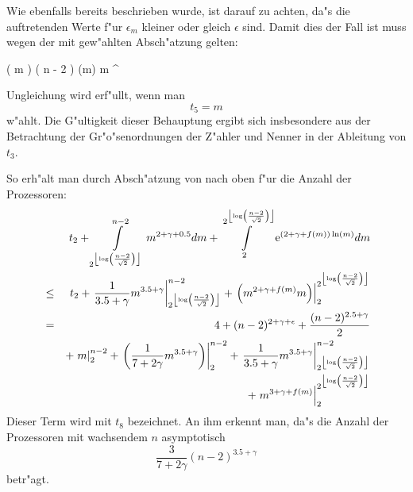 Wie ebenfalls bereits beschrieben wurde, ist darauf zu achten, da"s die
auftretenden Werte f"ur $\epsilon_m$ kleiner oder gleich $\epsilon$ sind.
Damit dies der Fall ist muss wegen der mit  
gew"ahlten Absch"atzung gelten:
\begin{MyEqnArray}
    \MT  \log( m ) \MT \leq \MT \lc \log( n - 2 ) \rc 
\MNl
    \Rightarrow \MT \log(m) \MT \leq \MT
        \lc \log \lb {} \rb \rc
\MNl
    \Rightarrow \MT m \MT \leq {}^{ \lc \log \lb {} \rb \rc }
\end{MyEqnArray}

Ungleichung
 wird erf"ullt, wenn man 
\[ t_5 = m \] w"ahlt. Die G"ultigkeit dieser Behauptung ergibt
sich insbesondere aus
der Betrachtung der Gr"o"senordnungen der Z"ahler und Nenner in der
Ableitung von $t_3$.

So erh"alt man durch Absch"atzung von  nach oben
f"ur die Anzahl der Prozessoren:
\begin{eqnarray*}
    & & t_2 + 
        \int\limits_{ 2^{\left\lfloor \log \left( \frac{n-2}{\sqrt{2}} \right) \right\rfloor} }^{n-2} 
            m^{2+\gamma+0.5} dm
        + \int\limits_2^{ 2^{\left\lfloor \log \left( \frac{n-2}{\sqrt{2}} \right) \right\rfloor} }
            \mbox{\rm e}^{ (2+\gamma+f(m)) \ln(m) } dm \\
    & \leq & t_2 + 
        \left. \frac{1}{3.5+\gamma} m^{3.5+\gamma} 
        \right|_{ 2^{\left\lfloor \log \left( \frac{n-2}{\sqrt{2}} \right) \right\rfloor} }^{n-2}
        + \left. \left( m^{ 2+\gamma+f(m) } m \right)
          \right|_2^{ 2^{\left\lfloor \log \left( \frac{n-2}{\sqrt{2}} \right) \right\rfloor} } \\
    & = &  4 + (n-2)^{2+\gamma+\epsilon} + 
               \frac{ (n-2)^{2.5+\gamma} }{ 2 } \\
    & & 
         + \left. m \right|_2^{n-2} +
           \left. \left(
               \frac{1}{7+2\gamma} m^{3.5+\gamma}
           \right) \right|_2^{n-2} 
        +  
        \left. \frac{1}{3.5+\gamma} m^{3.5+\gamma} 
        \right|_{ 2^{\left\lfloor \log \left( \frac{n-2}{\sqrt{2}} \right) \right\rfloor} }^{n-2} \\
    & & +
         \left. m^{3+\gamma+f(m)}
         \right|_2^{ 2^{\left\lfloor \log \left( \frac{n-2}{\sqrt{2}} \right) \right\rfloor} }
\end{eqnarray*}
Dieser Term wird mit $t_8$ bezeichnet. An ihm erkennt man, da"s die
Anzahl der Prozessoren mit wachsendem $n$ asymptotisch
\[
    \frac{3}{7+2\gamma} (n-2)^{3.5+\gamma}
\]
betr"agt.

